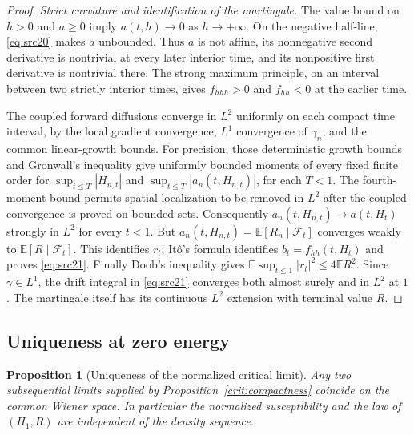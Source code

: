 \documentclass[11pt,a4paper]{article}
\numberwithin{equation}{section}
\newtheorem{proposition}[theorem]{Proposition}
\theoremstyle{definition}
\theoremstyle{remark}
\newcommand{\E}{\mathbb E}
\begin{document}
\begin{proof}
\emph{Strict curvature and identification of the martingale.}
The value bound on $h>0$ and $a\ge0$ imply $a(t,h)\to0$ as
$h\to+\infty$.  On the negative half-line, \eqref{eq:src20} makes $a$
unbounded.  Thus $a$ is not affine, its nonnegative second derivative is
nontrivial at every later interior time, and its nonpositive first
derivative is nontrivial there.  The strong maximum principle, on an
interval between two strictly interior times, gives
$f_{hhh}>0$ and $f_{hh}<0$ at the earlier time.

The coupled forward diffusions converge in $L^2$ uniformly on each
compact time interval, by the local gradient convergence,
$L^1$ convergence of $\gamma_n$, and the common linear-growth bounds.
For precision, those deterministic growth bounds and Gronwall's
inequality give uniformly bounded moments of every fixed finite
order for $\sup_{t\le T}|H_{n,t}|$ and
$\sup_{t\le T}|a_n(t,H_{n,t})|$, for each $T<1$.
The fourth-moment bound permits spatial localization to be removed
in $L^2$ after the coupled convergence is proved on bounded sets.
Consequently $a_n(t,H_{n,t})\to a(t,H_t)$ strongly in $L^2$ for every
$t<1$.  But $a_n(t,H_{n,t})=\E[R_n\mid\mathcal F_t]$ converges weakly
to $\E[R\mid\mathcal F_t]$.  This identifies $r_t$; It\^o's formula
identifies $b_t=f_{hh}(t,H_t)$ and proves \eqref{eq:src21}.
Finally Doob's inequality gives
$\E\sup_{t\le1}|r_t|^2\le4\E R^2$.
Since $\gamma\in L^1$, the drift integral in \eqref{eq:src21} converges
both almost surely and in $L^2$ at $1$.  The martingale itself has its
continuous $L^2$ extension with terminal value $R$.
\end{proof}

\subsection{Uniqueness at zero energy}

\begin{proposition}[Uniqueness of the normalized critical limit]
\label{crit:unique-critical}
Any two subsequential limits supplied by
Proposition~\ref{crit:compactness} coincide on the common Wiener space.
In particular the normalized susceptibility and the law of $(H_1,R)$
are independent of the density sequence.
\end{proposition}
\end{document}
